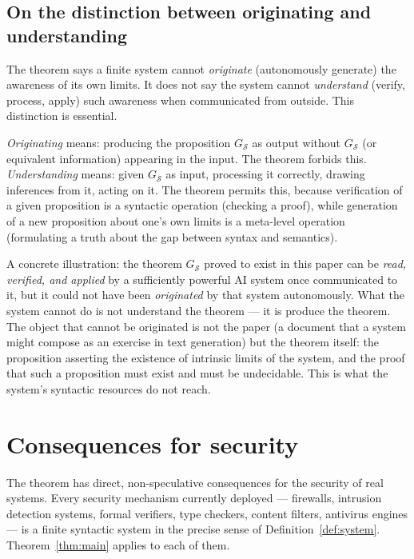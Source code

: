 \documentclass[11pt]{article}
\begin{document}
\subsection{On the distinction between originating and understanding}

The theorem says a finite system cannot \emph{originate} (autonomously
generate) the awareness of its own limits. It does not say the system
cannot \emph{understand} (verify, process, apply) such awareness when
communicated from outside. This distinction is essential.

\emph{Originating} means: producing the proposition $G_{\mathcal{S}}$
as output without $G_{\mathcal{S}}$ (or equivalent information)
appearing in the input. The theorem forbids this. \emph{Understanding}
means: given $G_{\mathcal{S}}$ as input, processing it correctly,
drawing inferences from it, acting on it. The theorem permits this,
because verification of a given proposition is a syntactic operation
(checking a proof), while generation of a new proposition about one's
own limits is a meta-level operation (formulating a truth about the gap
between syntax and semantics).

A concrete illustration: the theorem $G_{\mathcal{S}}$ proved to exist
in this paper can be \emph{read, verified, and applied} by a
sufficiently powerful AI system once communicated to it, but it could
not have been \emph{originated} by that system autonomously. What the
system cannot do is not understand the theorem --- it is produce the
theorem. The object that cannot be originated is not the paper (a
document that a system might compose as an exercise in text generation)
but the theorem itself: the proposition asserting the existence of
intrinsic limits of the system, and the proof that such a proposition
must exist and must be undecidable. This is what the system's syntactic
resources do not reach.


\section{Consequences for security}
\label{sec:security}


The theorem has direct, non-speculative consequences for the security of
real systems. Every security mechanism currently deployed --- firewalls,
intrusion detection systems, formal verifiers, type checkers, content
filters, antivirus engines --- is a finite syntactic system in the
precise sense of Definition~\ref{def:system}. Theorem~\ref{thm:main}
applies to each of them.
\end{document}

